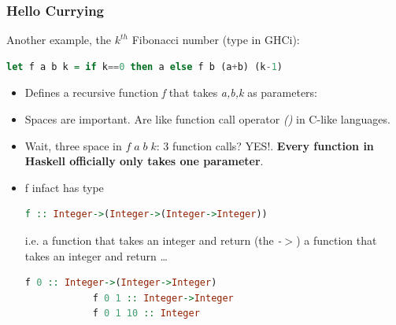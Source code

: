 		\begin{frame}[fragile]\frametitle{Hello Currying}
		Another example, the $k^{th}$ Fibonacci number (type in GHCi):
		\begin{lstlisting}[language=Haskell,xleftmargin=-1.5em]
			let f a b k = if k==0 then a else f b (a+b) (k-1)
		\end{lstlisting}
		\begin{itemize}
		  \item	Defines a recursive function \emph{f} that takes \emph{a,b,k} as parameters:
		  \item Spaces are important. Are like function call operator
		  \emph{()} in C-like languages.
		  \item Wait, three space in $f\;a\;b\;k$: 3 function
		  calls? YES!. \textbf{Every function in Haskell officially only takes one
		  parameter}. 
		  \item f infact has type
		 \begin{lstlisting}[language=Haskell,xleftmargin=-1.5em]
			f :: Integer->(Integer->(Integer->Integer))
		\end{lstlisting}
		i.e. a function that takes an integer and return (the \emph{-$>$}) a function
		that takes an integer and return \ldots
		 \begin{lstlisting}[language=Haskell,xleftmargin=-1.5em]
			f 0 :: Integer->(Integer->Integer)
			f 0 1 :: Integer->Integer
			f 0 1 10 :: Integer
		\end{lstlisting}
		
		\end{itemize}
		\end{frame}
		
